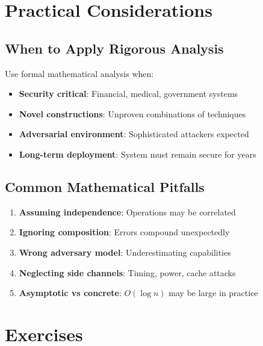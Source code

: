 \section{Practical Considerations}

\subsection{When to Apply Rigorous Analysis}

Use formal mathematical analysis when:
\begin{itemize}
\item \textbf{Security critical}: Financial, medical, government systems
\item \textbf{Novel constructions}: Unproven combinations of techniques
\item \textbf{Adversarial environment}: Sophisticated attackers expected
\item \textbf{Long-term deployment}: System must remain secure for years
\end{itemize}

\subsection{Common Mathematical Pitfalls}

\begin{enumerate}
\item \textbf{Assuming independence}: Operations may be correlated
\item \textbf{Ignoring composition}: Errors compound unexpectedly
\item \textbf{Wrong adversary model}: Underestimating capabilities
\item \textbf{Neglecting side channels}: Timing, power, cache attacks
\item \textbf{Asymptotic vs concrete}: $O(\log n)$ may be large in practice
\end{enumerate}

\section{Exercises}

